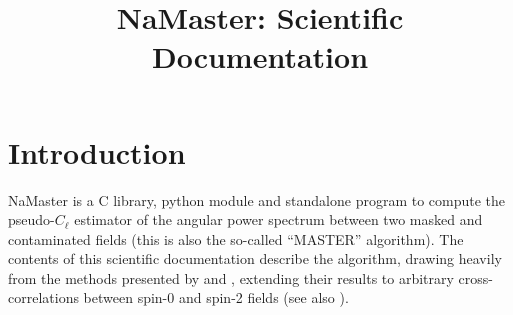 \documentclass[a4paper,10pt]{article}
\title{NaMaster: Scientific Documentation}
\begin{document}
\maketitle
\noindent\makebox[\linewidth]{\rule{\textwidth}{1pt}}
\tableofcontents
\noindent\makebox[\linewidth]{\rule{\textwidth}{1pt}}

\section{Introduction}
NaMaster is a C library, python module and standalone program to compute the pseudo-$C_\ell$ estimator of the angular power spectrum between two masked and contaminated fields (this is also the so-called ``MASTER'' algorithm). The contents of this scientific documentation describe the algorithm, drawing heavily from the methods presented by \cite{2002ApJ...567....2H} and \cite{2017MNRAS.465.1847E}, extending their results to arbitrary cross-correlations between spin-0 and spin-2 fields (see also \cite{2003ApJS..148..161K}).
\end{document}
